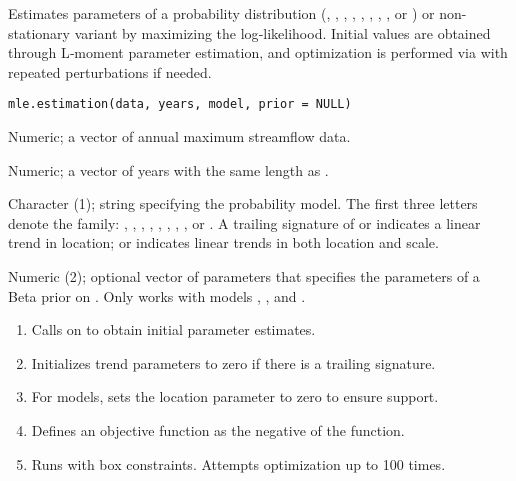 \documentclass[a4paper]{book}
\begin{document}
%
\begin{Description}
Estimates parameters of a probability distribution (, , , , ,
, , , or ) or non-stationary variant by maximizing the log‐likelihood.
Initial values are obtained through L‐moment parameter estimation, and optimization is
performed via  with repeated perturbations if needed.
\end{Description}
%
\begin{Usage}
\begin{verbatim}
mle.estimation(data, years, model, prior = NULL)
\end{verbatim}
\end{Usage}
%
\begin{Arguments}
\begin{ldescription}
\item[\code{data}] Numeric; a vector of annual maximum streamflow data.

\item[\code{years}] Numeric; a vector of years with the same length as .

\item[\code{model}] Character (1); string specifying the probability model. The first three
letters denote the family: , , , , , , ,
, or . A trailing signature of  or  indicates a linear trend
in location;  or  indicates linear trends in both location and scale.

\item[\code{prior}] Numeric (2); optional vector of parameters  that specifies
the parameters of a Beta prior on \eqn{\kappa}{}. Only works with models ,
, and .
\end{ldescription}
\end{Arguments}
%
\begin{Details}
\begin{enumerate}

\item{} Calls  on  to obtain initial parameter estimates.
\item{} Initializes trend parameters to zero if there is a trailing signature.
\item{} For  models, sets the location parameter to zero to ensure support.
\item{} Defines an objective function as the negative of the  function.
\item{} Runs  with box constraints. Attempts optimization
up to 100 times.

\end{enumerate}

\end{Details}
\end{document}
